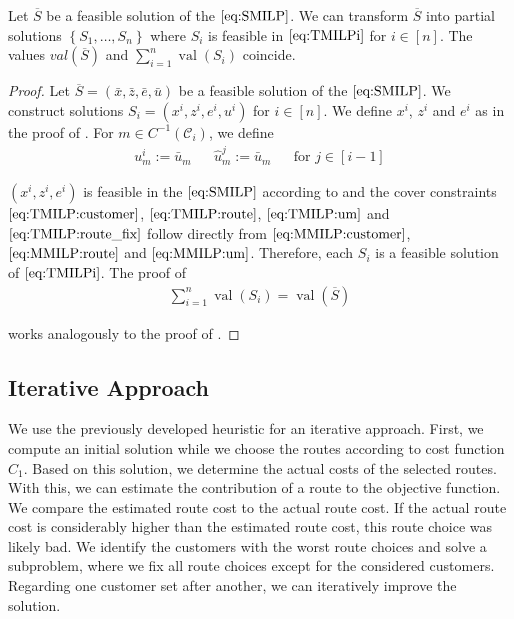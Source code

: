 \begin{theorem}
\label{thm:equivalence_SMILP_TMILP}

Let $\overline{S}$ be a feasible solution of the $\eqref{eq:SMILP}$. We can transform $\overline{S}$ into partial solutions $\left\{S_1,\dots,S_n\right\}$ where $S_i$ is feasible in $\eqref{eq:TMILPi}$ for ${i\in[n]}$. The values ${val}(\overline{S})$ and ${\sum_{i=1}^n \operatorname{val}\left(S_i\right)}$ coincide.

\end{theorem}

\begin{proof}

Let ${\overline{S}=\left(\bar{x},\bar{z},\bar{e},\bar{u}\right)}$ be a feasible solution of the $\eqref{eq:SMILP}$. We construct solutions ${S_i=\left(x^i,z^i,e^i,u^i\right)}$ for ${i\in[n]}$. We define $x^i$, $z^i$ and $e^i$ as in the proof of . For ${m\in C^{-1}\left(\mathcal{C}_i\right)}$, we define
\begin{align*}
	u^i_m := \bar{u}_m && \hat{u}^j_m := \bar{u}_m && \text{for } j\in[i-1]
\end{align*}

$\left(x^i,z^i,e^i\right)$ is feasible in the $\eqref{eq:SMILP}$ according to  and the cover constraints $\eqref{eq:TMILP:customer}$, $\eqref{eq:TMILP:route}$, $\eqref{eq:TMILP:um}$ and $\eqref{eq:TMILP:route_fix}$ follow directly from $\eqref{eq:MMILP:customer}$, $\eqref{eq:MMILP:route}$ and $\eqref{eq:MMILP:um}$. Therefore, each $S_i$ is a feasible solution of $\eqref{eq:TMILPi}$. The proof of
\begin{align*}
	\sum_{i=1}^n\operatorname{val}\left(S_i\right) = \operatorname{val}\left(\overline{S}\right)
\end{align*}

works analogously to the proof of .

\end{proof}


\subsection{Iterative Approach}
\label{sec:iterative_approach}

We use the previously developed heuristic for an iterative approach. First, we compute an initial solution while we choose the routes according to cost function $C_1$. Based on this solution, we determine the actual costs of the selected routes. With this, we can estimate the contribution of a route to the objective function. We compare the estimated route cost to the actual route cost. If the actual route cost is considerably higher than the estimated route cost, this route choice was likely bad. We identify the customers with the worst route choices and solve a subproblem, where we fix all route choices except for the considered customers. Regarding one customer set after another, we can iteratively improve the solution.

